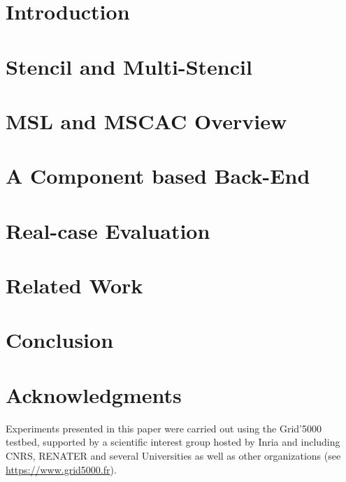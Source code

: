 \documentclass{acm_proc_article-sp}
\begin{document}
\section{Introduction}
\label{sect:intro}

\section{Stencil and Multi-Stencil}
\label{sect:concept}

\section{MSL and MSCAC Overview }
\label{sect:mscac}


\section{A Component based Back-End}
\label{sect:component}

\section{Real-case Evaluation}
\label{sect:eval}

\section{Related Work}
\label{sect:related}

\section{Conclusion}
\label{sect:conclusion}


\section{Acknowledgments}

Experiments presented in this paper were carried out using the
Grid'5000 testbed, supported by a scientific interest group hosted by
Inria and including CNRS, RENATER and several Universities as well as
other organizations (see \url{https://www.grid5000.fr}).

\small

  
\end{document}
